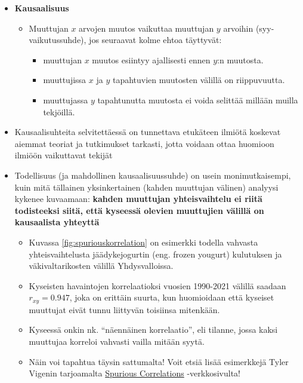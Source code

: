 \documentclass[
]{book}
\providecommand{\tightlist}{%
  \setlength{\itemsep}{0pt}\setlength{\parskip}{0pt}}
\begin{document}
\FloatBarrier

\begin{itemize}
\item
  \textbf{Kausaalisuus}

  \begin{itemize}
  \tightlist
  \item
    Muuttujan \(x\) arvojen muutos vaikuttaa muuttujan \(y\) arvoihin (syy-vaikutussuhde), jos seuraavat kolme ehtoa täyttyvät:

    \begin{itemize}
    \tightlist
    \item
      muuttujan \(x\) muutos esiintyy ajallisesti ennen \(y\):n muutosta.
    \item
      muuttujissa \(x\) ja \(y\) tapahtuvien muutosten välillä on riippuvuutta.
    \item
      muuttujassa \(y\) tapahtunutta muutosta ei voida selittää millään muilla tekjöillä.
    \end{itemize}
  \end{itemize}
\item
  Kausaalisuhteita selvitettäessä on tunnettava etukäteen ilmiötä koskevat aiemmat teoriat ja tutkimukset tarkasti, jotta voidaan ottaa huomioon ilmiöön vaikuttavat tekijät
\item
  Todellisuus (ja mahdollinen kausaalisuussuhde) on usein monimutkaisempi, kuin mitä tällainen yksinkertainen (kahden muuttujan välinen) analyysi kykenee kuvaamaan: \textbf{kahden muuttujan yhteisvaihtelu ei riitä todisteeksi siitä, että kyseessä olevien muuttujien välillä on kausaalista yhteyttä}

  \begin{itemize}
  \tightlist
  \item
    Kuvassa \ref{fig:spuriouskorrelation} on esimerkki todella vahvasta yhteisvaihtelusta jäädykejogurtin (eng. frozen yougurt) kulutuksen ja väkivaltarikosten välillä Yhdysvalloissa.
  \item
    Kyseisten havaintojen korrelaatioksi vuosien 1990-2021 välillä saadaan \(r_{xy} = 0.947\), joka on erittäin suurta, kun huomioidaan että kyseiset muuttujat eivät tunnu liittyvän toisiinsa mitenkään.
  \item
    Kyseessä onkin nk. ``näennäinen korrelaatio'', eli tilanne, jossa kaksi muuttujaa korreloi vahvasti vailla mitään syytä.
  \item
    Näin voi tapahtua täysin sattumalta! Voit etsiä lisää esimerkkejä Tyler Vigenin tarjoamalta \href{https://tylervigen.com/spurious-correlations}{Spurious Correlations} -verkkosivulta!
  \end{itemize}
\end{itemize}
\end{document}

